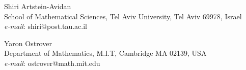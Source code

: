 \documentclass[12pt]{article}
\begin{document}
\bigskip
\noindent Shiri Artstein-Avidan\\
School of Mathematical Sciences, Tel Aviv University, Tel Aviv 69978, Israel\\
{\it e-mail}: shiri@post.tau.ac.il

\bigskip
\noindent Yaron Ostrover\\
Department of Mathematics, M.I.T, Cambridge MA 02139, USA\\
{\it e-mail}: ostrover@math.mit.edu
\end{document}
